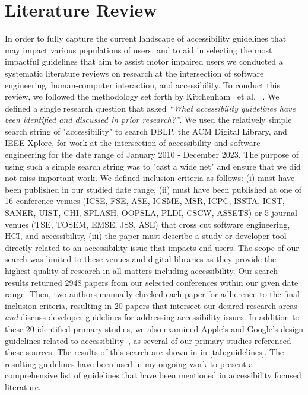 \newpage
\section{Literature Review}
\label{sec:SLR}

In order to fully capture the current landscape of accessibility guidelines that may impact various populations of users, and to aid in selecting the most impactful guidelines that aim to assist motor impaired users we conducted a systematic literature reviews on research at the intersection of software engineering, human-computer interaction, and accessibility. To conduct this review, we followed the methodology set forth by Kitchenham~ et al. ~\cite{kitchenham2007guidelines}. We defined a single research question that asked \textit{``What accessibility guidelines have been identified and discussed in prior research?''}. We used the relatively simple search string of "accessibility" to search DBLP, the ACM Digital Library, and IEEE Xplore, for work at the intersection of accessibility and software engineering for the date range of January 2010 - December 2023. The purpose of using such a simple search string was to "cast a wide net" and ensure that we did not miss important work. We defined inclusion criteria as follows: (i) must have been published in our studied date range, (ii) must have been published at one of 16 conference venues (ICSE, FSE, ASE, ICSME, MSR, ICPC, ISSTA, ICST, SANER, UIST, CHI, SPLASH, OOPSLA, PLDI, CSCW, ASSETS) or 5 journal venues (TSE, TOSEM, EMSE, JSS, ASE) that cross cut software engineering, HCI, and accessibility, (iii) the paper must describe a study or developer tool directly related to an accessibility issue that impacts end-users. The scope of our search was limited to these venues and digital libraries as they provide the highest quality of research in all matters including accessibility. Our search results returned 2948 papers from our selected conferences within our given date range. Then, two authors manually checked  each paper for adherence to the final inclusion criteria, resulting in 20 papers that intersect our desired research areas \textit{and} discuss developer guidelines for addressing accessibility issues. In addition to these 20 identified primary studies, we also examined Apple's and Google's design guidelines related to accessibility~\cite{AppleAccess,GoogleAccess}, as several of our primary studies referenced these sources. The results of this search are shown in in \ref{tab:guidelines}. The resulting guidelines have been used in my ongoing work to present a comprehensive list of guidelines that have been mentioned in accessibility focused literature. 


